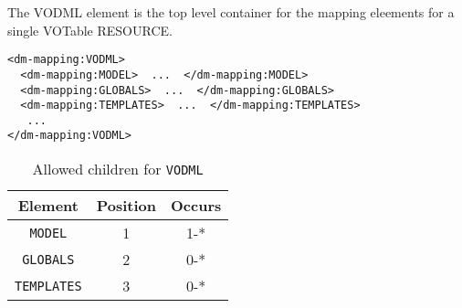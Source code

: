 The VODML element is the top level container for the mapping eleements for a single VOTable RESOURCE.

\begin{lstlisting}[frame=single,caption={Example VODML mapping block},style=XML,basicstyle=\tiny]
<dm-mapping:VODML>
  <dm-mapping:MODEL>  ...  </dm-mapping:MODEL>
  <dm-mapping:GLOBALS>  ...  </dm-mapping:GLOBALS>
  <dm-mapping:TEMPLATES>  ...  </dm-mapping:TEMPLATES>
   ...
</dm-mapping:VODML>
\end{lstlisting}

\begin{table}[!htbp]
  \small
  \centering
  \begin{tabulary}{\linewidth}{|c |c |c|}
    \hline 
        \textbf{Element} &
        \textbf{Position} &
        \textbf{Occurs}\\
    \hline
    \hline  
      \texttt{MODEL} &           
      1 &           
      1-*\\
    \hline    
      \texttt{GLOBALS} &           
      2 &           
      0-*\\
    \hline  
      \texttt{TEMPLATES} &           
      3 &           
      0-*\\
    \hline 
  \end{tabulary}
    \caption{Allowed children for \texttt{VODML}} 
    \label{tbl:vodml-children}
\end{table}


